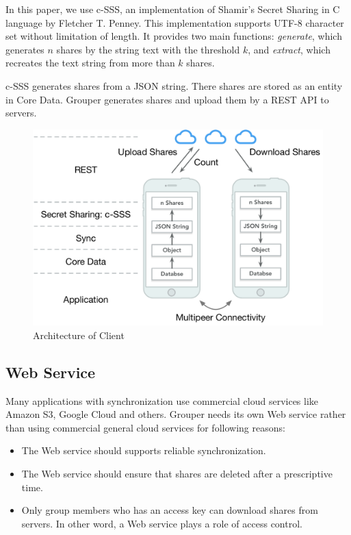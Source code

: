 \documentclass[twocolumn,10pt]{article}
\begin{document}
In this paper, we use c-SSS\cite{c-sss}, an implementation of Shamir's Secret Sharing in C language by Fletcher T. Penney. This implementation supports UTF-8 character set without limitation of length. It provides two main functions: \emph{generate}, which generates $n$ shares by the string text with the threshold $k$, and \emph{extract}, which recreates the text string from more than $k$ shares. 

c-SSS generates shares from a JSON string. There shares are stored as an entity in Core Data. Grouper generates shares and upload them by a REST API to servers.

\begin{figure}[t]
\centering
\includegraphics[scale=0.35]{architecture}
\caption{Architecture of Client}
\end{figure}

\subsection{Web Service}
Many applications with synchronization use commercial cloud services like Amazon S3, Google Cloud and others. Grouper needs its own Web service rather than using commercial general cloud services for following reasons:

\begin{itemize}
\setlength{\itemsep}{1pt}
\setlength{\parskip}{0pt}
\setlength{\parsep}{0pt}
	\item The Web service should supports reliable synchronization.
    \item The Web service should ensure that shares are deleted after a prescriptive time.
    \item Only group members who has an access key can download shares from servers. In other word, a Web service plays a role of access control.
\end{itemize}
\end{document}
